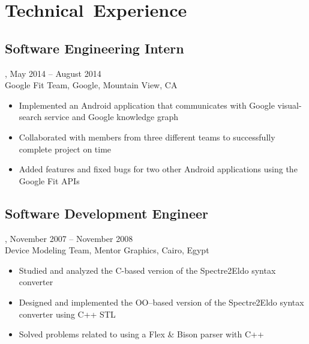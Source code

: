 \section{Technical~Experience}
\subsection{Software Engineering Intern}, May 2014 -- August 2014\\
Google Fit Team, Google, Mountain View, CA
\begin{itemize}
\item Implemented an Android application that communicates with Google visual-search service and Google knowledge graph
\item Collaborated with members from three different teams to successfully complete project on time
\item Added features and fixed bugs for two other Android applications using the Google Fit APIs
\end{itemize}
\subsection{Software Development Engineer}, November 2007 -- November 2008\\
Device Modeling Team, Mentor Graphics, Cairo, Egypt
\begin{itemize}
\item Studied and analyzed the C-based version of the Spectre2Eldo syntax converter
\item Designed and implemented the OO--based version of the Spectre2Eldo syntax converter using C++ STL
\item Solved problems related to using a Flex \& Bison parser with C++
\end{itemize}
